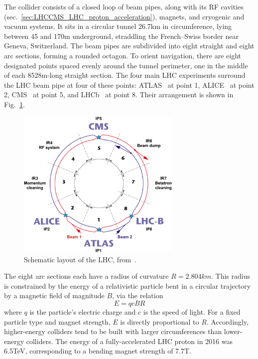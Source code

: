 \documentclass[oneside, letterpaper, 12pt, oldfontcommands]{memoir}
\begin{document}
The collider consists of a closed loop of beam pipes, along with its RF cavities (sec.~\ref{sec:LHCCMS_LHC_proton_acceleration}), magnets,
and cryogenic and vacuum systems. It sits in a circular tunnel 26.7\unit{km} in circumference, lying between 45 and 170\unit{m} underground, straddling
the French--Swiss border near Geneva, Switzerland. The beam pipes are subdivided into eight straight and eight arc sections, forming a rounded octagon.
To orient navigation, there are eight designated points spaced evenly around the tunnel perimeter, one in the middle of each 8528\unit{m}-long straight section.
The four main LHC experiments surround the LHC beam pipe at four of these points: ATLAS~\cite{ref:10.1088/1748-0221/3/08/S08003}
at point 1, ALICE~\cite{ref:1748-0221/3/08/S08002} at point 2, CMS~\cite{ref:1748-0221/3/08/S08004} at point 5, and LHCb~\cite{ref:1748-0221/3/08/S08005} at point 8.
Their arrangement is shown in Fig.~\ref{fig:LHC_schematic}.

\begin{figure}[hbtp]
  \begin{center}
    \includegraphics[width=0.70\textwidth]{Figures/Schematic-layout-of-the-LHC-at-CERN.png}
    \caption{
    Schematic layout of the LHC, from~\cite{ref:PhysRevAccelBeams.20.091002}.
    }
    \label{fig:LHC_schematic}
  \end{center}
\end{figure}

The eight arc sections each have a radius of curvature $R = 2.804\unit{km}$. This radius is constrained by the energy of a relativistic particle
bent in a circular trajectory by a magnetic field of magnitude $B$, via the relation~\cite{ref:WilleAccelerators}
\begin{equation}
E = qcBR
\end{equation}
where $q$ is the particle's electric charge and $c$ is the speed of light. For a fixed
particle type and magnet strength, $E$ is directly proportional to $R$. Accordingly, higher-energy
colliders tend to be built with larger circumferences than lower-energy colliders.
The energy of a fully-accelerated LHC proton in 2016 was 6.5\unit{TeV},
corresponding to a bending magnet strength of 7.7\unit{T}.
\end{document}
